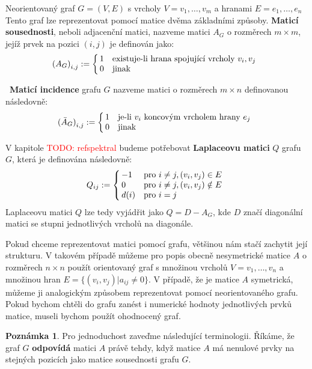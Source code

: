 \documentclass[11pt,american,czech,oneside]{book}
\theoremstyle{plain}
\theoremstyle{definition}
\newtheorem{remark}{Poznámka}
\newcommand{\TODO}[1]{\textcolor{red}{TODO: #1}}
\begin{document}
Neorientovaný graf $G=(V,E)$ s vrcholy $V = {v_1, \ldots, v_m}$ a hranami $E = {e_1, \ldots, e_n}$ Tento graf lze reprezentovat pomocí matice dvěma základními způsoby. \textbf{Maticí sousednosti}, neboli adjacenční matici, nazveme matici $A_G$ o rozměrech $m \times m$, jejíž prvek na pozici $(i,j)$ je definován jako:
\[
  {(A_G)}_{i,j} :=
  \left\{
    \begin{array}{@{\,}ll}
      1  & \mbox{existuje-li hrana spojující vrcholy $v_i, v_j$} \\
      0  & \mbox{jinak}
    \end{array}
  \right.
\]

 \textbf{Maticí incidence} grafu $G$ nazveme matici o rozměrech $m \times n$  definovanou následovně:
\[
  {(\bar{A}_G)}_{i,j} :=
  \left\{
	  \begin{array}{@{\,}ll}
		  1  & \mbox{je-li $v_i$ koncovým vrcholem hrany $e_j$} \\
		  0  & \mbox{jinak}
	  \end{array}
  \right.
\]

V kapitole \TODO{ref{spektral}} budeme potřebovat \textbf{Laplaceovu matici} $Q$ grafu $G$, která je definována následovně:
\[
Q_{ij} :=
\left\{
	\begin{array}{@{\,}ll}
		-1  & \mbox{pro } i \neq j, (v_i,v_j) \in E \\
		0 & \mbox{pro } i \neq j, (v_i,v_j) \notin E\\
        d(i) & \mbox{pro } i = j
	\end{array}
\right.
\]
Laplaceovu matici $Q$ lze tedy vyjádřit jako $Q = D - A_G$, kde $D$  značí diagonální matici se stupni jednotlivých vrcholů na diagonále.

Pokud chceme reprezentovat matici pomocí grafu, většinou nám stačí zachytit její strukturu. V takovém případě můžeme pro popis obecně nesymetrické matice $A$ o rozměrech $n \times n$ použít orientovaný graf s množinou vrcholů $V = {v_1,\ldots,v_n}$ a množinou hran $E =\{(v_i,v_j)|a_{ij}\neq 0\}$. V případě, že je matice $A$ symetrická, můžeme ji analogickým způsobem reprezentovat pomocí neorientovaného grafu.
Pokud bychom chtěli do grafu zanést i numerické hodnoty jednotlivých prvků matice, museli bychom použít ohodnocený graf.

\begin{remark}
  Pro jednoduchost zaveďme následující terminologii. Říkáme, že graf $G$ \textbf{odpovídá} matici $A$ právě tehdy, když matice $A$ má nenulové prvky na stejných pozicích jako matice sousednosti grafu $G$.
\end{remark}
\end{document}
